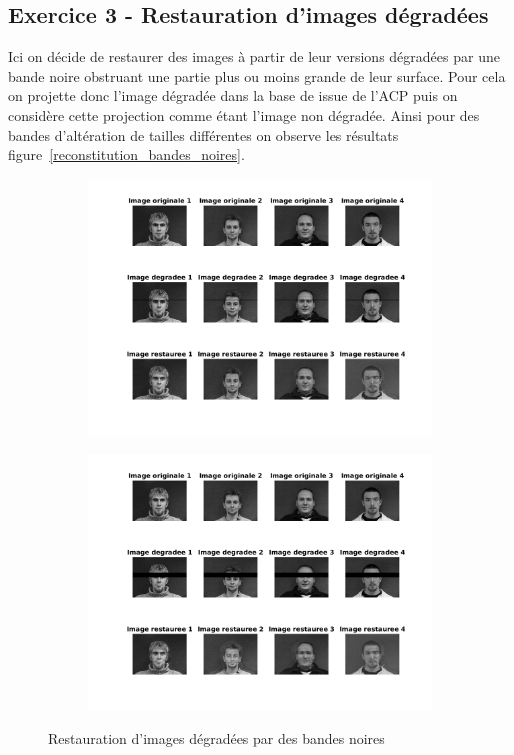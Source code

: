 \documentclass{article}
\begin{document}
\subsection{Exercice 3 - Restauration d'images dégradées}
Ici on décide de restaurer des images à partir de leur versions dégradées par une bande noire obstruant une partie plus ou moins grande de leur surface. Pour cela on projette donc l'image dégradée dans la base de issue de l'ACP puis on considère cette projection comme étant l'image non dégradée. Ainsi pour des bandes d'altération de tailles différentes on observe les résultats figure~\ref{reconstitution_bandes_noires}.
\begin{figure}[ht]
    \centering
    \begin{subfigure}[c]{0.7\linewidth}
    	\centering
    	\includegraphics[width=\linewidth]{images/2/2-3-5.png}
    \end{subfigure}
    \begin{subfigure}[c]{0.7\linewidth}
    	\centering
    	\includegraphics[width=\linewidth]{images/2/2-3-30.png}
    \end{subfigure}
    \caption{Restauration d'images dégradées par des bandes noires}
    \label{acp_gantrycrane}
\end{figure}
\end{document}

